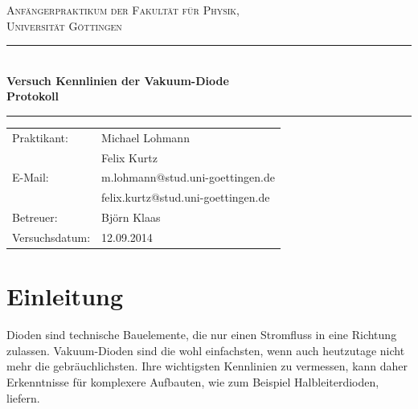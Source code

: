 \documentclass[12pt,a4paper,titlepage,headinclude,bibtotoc]{scrartcl}
\begin{document}
\begin{titlepage}
\centering
\textsc{\Large Anfängerpraktikum der Fakultät für
  Physik,\\[1.5ex] Universität Göttingen}

\vspace*{3cm}

\rule{\textwidth}{1pt}\\[0.5cm]
{\huge \bfseries
  Versuch Kennlinien der Vakuum-Diode\\[1.5ex]
  Protokoll}\\[0.5cm]
\rule{\textwidth}{1pt}

\vspace*{3cm}

\begin{Large}
\begin{tabular}{ll}
Praktikant: &  Michael Lohmann\\
 &  Felix Kurtz\\
 E-Mail: & m.lohmann@stud.uni-goettingen.de\\
 &  felix.kurtz@stud.uni-goettingen.de\\
 Betreuer: &Björn Klaas\\
 Versuchsdatum: & 12.09.2014\\
\end{tabular}
\end{Large}

\vspace*{0.8cm}

\begin{Large}
\end{Large}

\end{titlepage}

\tableofcontents

\newpage

\section{Einleitung}
\label{sec:einleitung}
Dioden sind technische Bauelemente, die nur einen Stromfluss in eine Richtung zulassen.
Vakuum-Dioden sind die wohl einfachsten, wenn auch heutzutage nicht mehr die gebräuchlichsten.
Ihre wichtigsten Kennlinien zu vermessen, kann daher Erkenntnisse für komplexere Aufbauten, wie zum Beispiel Halbleiterdioden, liefern.
\end{document}
